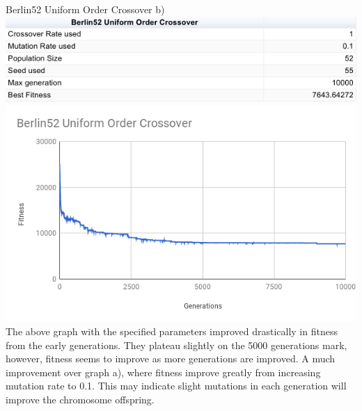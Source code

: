 \documentclass[conference]{IEEEtran}
\begin{document}
Berlin52 Uniform Order Crossover b)
\includegraphics[scale=0.42]{Berlin52/UOC/Berlin52_UOC_b)_table}
\includegraphics[scale=0.42]{Berlin52/UOC/Berlin52_UOC_b)}
The above graph with the specified parameters improved drastically in fitness from the early generations. They plateau slightly on the 5000 generations mark, however, fitness seems to improve as more generations are improved. A much improvement over graph a), where fitness improve greatly from increasing mutation rate to 0.1. This may indicate slight mutations in each generation will improve the chromosome offspring.
\end{document}
